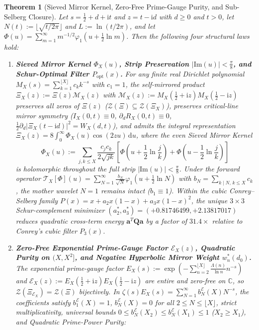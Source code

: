 \documentclass[11pt,reqno]{amsart}
\newtheorem{theorem}{Theorem}[section]
\theoremstyle{definition}
\theoremstyle{remark}
\numberwithin{equation}{section}
\newcommand{\C}{\mathbb{C}}
\newcommand{\dd}{\mathrm{d}}
\newcommand{\ii}{\mathrm{i}}
\newcommand{\Ima}{\mathrm{Im}}
\begin{document}
\begin{theorem}[Sieved Mirror Kernel, Zero-Free Prime-Gauge Purity, and Sub-Selberg Closure]\label{thm:main}
Let $s = \frac{1}{2} + d + \ii t$ and $z = t - \ii d$ with $d \ge 0$ and $t > 0$, let $N(t) := \lfloor\sqrt{t/2\pi}\rfloor$ and $L := \ln(t/2\pi)$, and let $\Phi(u) = \sum_{m=1}^{\infty} m^{-1/2}\varphi_1(u + \frac{1}{2}\ln m)$. Then the following four structural laws hold:
\begin{enumerate}[label=\textup{(\roman*)},leftmargin=2.2em]
\item \textbf{Sieved Mirror Kernel $\Phi_X(u)$, Strip Preservation $|\Ima(u)| < \frac{\pi}{8}$, and Schur-Optimal Filter $P_{\mathrm{opt}}(x)$.} For any finite real Dirichlet polynomial $M_X(s) = \sum_{k=1}^{\lfloor X\rfloor} c_k k^{-s}$ with $c_1 = 1$, the self-mirrored product $\Xi_X(z) := \Xi(z)\mathcal{M}_X(z)$ with $\mathcal{M}_X(z) := M_X(\frac{1}{2}+\ii z)M_X(\frac{1}{2}-\ii z)$ preserves all zeros of $\Xi(z)$ ($\mathcal{Z}(\Xi) \subseteq \mathcal{Z}(\Xi_X)$), preserves critical-line mirror symmetry ($I_X(0,t) \equiv 0$, $\partial_d R_X(0,t) \equiv 0$, $\frac{1}{2}\partial_d|\Xi_X(t-\ii d)|^2 = W_X(d,t)$), and admits the integral representation $\Xi_X(z) = 8\int_0^{\infty} \Phi_X(u)\cos(2zu)\,\dd u$, where the even \emph{Sieved Mirror Kernel}
\begin{equation}\label{eq:intro_phi_X}
\Phi_X(u) := \sum_{j,k \le X} \frac{c_j c_k}{2\sqrt{jk}}\left[\Phi\!\left(u + \frac{1}{2}\ln\frac{j}{k}\right) + \Phi\!\left(u - \frac{1}{2}\ln\frac{j}{k}\right)\right]
\end{equation}
is holomorphic throughout the full strip $|\Ima(u)| < \frac{\pi}{8}$. Under the forward operator $\mathcal{T}_X[\Phi](u) = \sum_{N=1}^{\infty} \frac{b_N}{\sqrt{N}}\varphi_1(u + \frac{1}{2}\ln N)$ with $b_N = \sum_{k \mid N,\, k \le X} c_k$, the mother wavelet $N = 1$ remains intact ($b_1 \equiv 1$). Within the cubic Conrey--Selberg family $P(x) = x + a_2 x(1-x) + a_3 x(1-x)^2$, the unique $3 \times 3$ Schur-complement minimizer $(a_2^*, a_3^*) = (+0.81746499, +2.13817017)$ reduces quadratic cross-term energy $\mathbf{a}^T\mathbf{Q}\mathbf{a}$ by a factor of $31.4\times$ relative to Conrey's cubic filter $P_3(x)$.
\item \textbf{Zero-Free Exponential Prime-Gauge Factor $\mathcal{E}_X(z)$, Quadratic Purity on $(X, X^2]$, and Negative Hyperbolic Mirror Weight $w_n^*(d_0)$.} The exponential prime-gauge factor $E_X(s) := \exp(-\sum_{n=2}^{\lfloor X\rfloor} \frac{\Lambda(n)}{\ln n}n^{-s})$ and $\mathcal{E}_X(z) := E_X(\frac{1}{2}+\ii z)E_X(\frac{1}{2}-\ii z)$ are entire and zero-free on $\C$, so $\mathcal{Z}(\Xi_{\mathcal{E}_X}) = \mathcal{Z}(\Xi)$ bijectively. In $\zeta(s)E_X(s) = \sum_{N=1}^{\infty} b_N^{\mathcal{E}}(X)N^{-s}$, the coefficients satisfy $b_1^{\mathcal{E}}(X) = 1$, $b_N^{\mathcal{E}}(X) = 0$ for all $2 \le N \le \lfloor X\rfloor$, strict multiplicativity, universal bounds $0 \le b_N^{\mathcal{E}}(X_2) \le b_N^{\mathcal{E}}(X_1) \le 1$ ($X_2 \ge X_1$), and \emph{Quadratic Prime-Power Purity}:

\end{enumerate}
\end{theorem}
\end{document}
